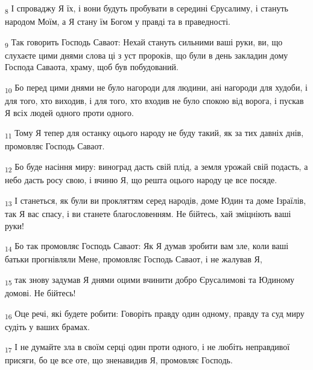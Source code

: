 \begin{tcolorbox}
\textsubscript{8} І спроваджу Я їх, і вони будуть пробувати в середині Єрусалиму, і стануть народом Моїм, а Я стану їм Богом у правді та в праведності.
\end{tcolorbox}
\begin{tcolorbox}
\textsubscript{9} Так говорить Господь Саваот: Нехай стануть сильними ваші руки, ви, що слухаєте цими днями слова ці з уст пророків, що були в день закладин дому Господа Саваота, храму, щоб був побудований.
\end{tcolorbox}
\begin{tcolorbox}
\textsubscript{10} Бо перед цими днями не було нагороди для людини, ані нагороди для худоби, і для того, хто виходив, і для того, хто входив не було спокою від ворога, і пускав Я всіх людей одного проти одного.
\end{tcolorbox}
\begin{tcolorbox}
\textsubscript{11} Тому Я тепер для останку оцього народу не буду такий, як за тих давніх днів, промовляє Господь Саваот.
\end{tcolorbox}
\begin{tcolorbox}
\textsubscript{12} Бо буде насіння миру: виноград дасть свій плід, а земля урожай свій подасть, а небо дасть росу свою, і вчиню Я, що решта оцього народу це все посяде.
\end{tcolorbox}
\begin{tcolorbox}
\textsubscript{13} І станеться, як були ви прокляттям серед народів, доме Юдин та доме Ізраїлів, так Я вас спасу, і ви станете благословенням. Не бійтесь, хай зміцніють ваші руки!
\end{tcolorbox}
\begin{tcolorbox}
\textsubscript{14} Бо так промовляє Господь Саваот: Як Я думав зробити вам зле, коли ваші батьки прогнівляли Мене, промовляє Господь Саваот, і не жалував Я,
\end{tcolorbox}
\begin{tcolorbox}
\textsubscript{15} так знову задумав Я днями оцими вчинити добро Єрусалимові та Юдиному домові. Не бійтесь!
\end{tcolorbox}
\begin{tcolorbox}
\textsubscript{16} Оце речі, які будете робити: Говоріть правду один одному, правду та суд миру судіть у ваших брамах.
\end{tcolorbox}
\begin{tcolorbox}
\textsubscript{17} І не думайте зла в своїм серці один проти одного, і не любіть неправдивої присяги, бо це все оте, що зненавидив Я, промовляє Господь.
\end{tcolorbox}
